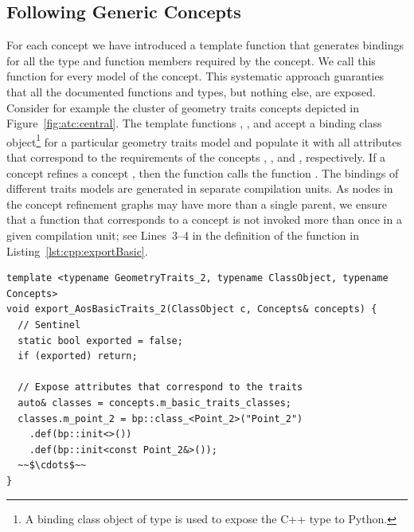 \subsection{Following Generic Concepts}
\label{sec:code:concepts}
For each concept we have introduced a template function that generates bindings for all the type and function members required by the concept. We call this function for every model of the concept. This systematic approach guaranties that all the documented functions and types, but nothing else, are exposed. Consider for example the cluster of geometry traits concepts depicted in Figure~\ref{fig:atc:central}. The template functions , , and  accept a binding class object\footnote{A binding class object of type  is used to expose the C++ type  to Python.} for a particular geometry traits model and populate it with all attributes that correspond to the requirements of the concepts , , and , respectively. If a concept  refines a concept , then the function  calls the function . The bindings of different traits models are generated in separate compilation units. As nodes in the concept refinement graphs may have more than a single parent, we ensure that a function that corresponds to a concept is not invoked more than once in a given compilation unit; see Lines~3--4 in the definition of the function  in Listing~\ref{lst:cpp:exportBasic}.

\begin{lstfloat}
\begin{lstlisting}[style=cppFramedStyle,%
                   basicstyle=\scriptsize,%
                   label={lst:cpp:exportBasic},%
                   caption={Exposing attributes that correspond to the concept \cppLstinline{AosBasicTraits_2}.}]
template <typename GeometryTraits_2, typename ClassObject, typename Concepts>
void export_AosBasicTraits_2(ClassObject c, Concepts& concepts) {
  // Sentinel
  static bool exported = false;
  if (exported) return;

  // Expose attributes that correspond to the traits
  auto& classes = concepts.m_basic_traits_classes;
  classes.m_point_2 = bp::class_<Point_2>("Point_2")
    .def(bp::init<>())
    .def(bp::init<const Point_2&>());
  ~~$\cdots$~~
}
\end{lstlisting}
\end{lstfloat}

